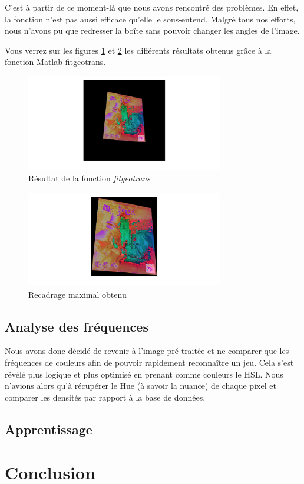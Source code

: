 \documentclass{st50_template}
\begin{document}
C'est à partir de ce moment-là que nous avons rencontré des problèmes. En effet, la fonction n'est pas aussi efficace qu'elle le sous-entend. Malgré tous nos efforts, nous n'avons pu que redresser la boîte sans pouvoir changer les angles de l'image.

Vous verrez sur les figures \ref{fitgeotrans} et \ref{transRecadre} les différents résultats obtenus grâce à la fonction Matlab fitgeotrans.

\begin{figure}[ht]
    \centering
    \includegraphics[width=0.77\textwidth]{images/fitgeotrans.jpg}
    \caption{Résultat de la fonction \emph{fitgeotrans}}
    \label{fitgeotrans}
\end{figure}

\begin{figure}[ht]
    \centering
    \includegraphics[width=0.77\textwidth]{images/transRecadre.jpg}
    \caption{Recadrage maximal obtenu}
    \label{transRecadre}
\end{figure}

\subsection{Analyse des fréquences}

Nous avons donc décidé de revenir à l'image pré-traitée et ne comparer que les fréquences de couleurs afin de pouvoir rapidement reconnaître un jeu. Cela s'est révélé plus logique et plus optimisé en prenant comme couleurs le HSL. Nous n'avions alors qu'à récupérer le Hue (à savoir la nuance) de chaque pixel et comparer les densités par rapport à la base de données.

\subsection{Apprentissage}

\section{Conclusion}
\end{document}
